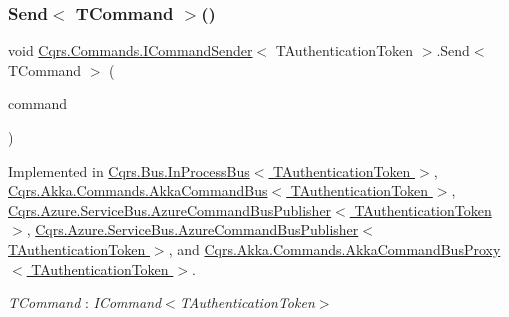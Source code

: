 \subsubsection{\texorpdfstring{Send$<$ T\+Command $>$()}{Send< TCommand >()}\hspace{0.1cm}{\footnotesize\ttfamily [1/2]}}
{\footnotesize\ttfamily void \hyperlink{interfaceCqrs_1_1Commands_1_1ICommandSender}{Cqrs.\+Commands.\+I\+Command\+Sender}$<$ T\+Authentication\+Token $>$.Send$<$ T\+Command $>$ (\begin{DoxyParamCaption}\item[{T\+Command}]{command }\end{DoxyParamCaption})}



Implemented in \hyperlink{classCqrs_1_1Bus_1_1InProcessBus_a6a074ef3663d2855875307b106fe4416}{Cqrs.\+Bus.\+In\+Process\+Bus$<$ T\+Authentication\+Token $>$}, \hyperlink{classCqrs_1_1Akka_1_1Commands_1_1AkkaCommandBus_a696f471533265685f80922e39727288e}{Cqrs.\+Akka.\+Commands.\+Akka\+Command\+Bus$<$ T\+Authentication\+Token $>$}, \hyperlink{classCqrs_1_1Azure_1_1ServiceBus_1_1AzureCommandBusPublisher_ad4bbbadcac7eb6a83e47649979bc2e7f}{Cqrs.\+Azure.\+Service\+Bus.\+Azure\+Command\+Bus\+Publisher$<$ T\+Authentication\+Token $>$}, \hyperlink{classCqrs_1_1Azure_1_1ServiceBus_1_1AzureCommandBusPublisher_ad4bbbadcac7eb6a83e47649979bc2e7f}{Cqrs.\+Azure.\+Service\+Bus.\+Azure\+Command\+Bus\+Publisher$<$ T\+Authentication\+Token $>$}, and \hyperlink{classCqrs_1_1Akka_1_1Commands_1_1AkkaCommandBusProxy_a15945f41b7439e722f5608f48b63c6d9}{Cqrs.\+Akka.\+Commands.\+Akka\+Command\+Bus\+Proxy$<$ T\+Authentication\+Token $>$}.

\begin{Desc}
\item[Type Constraints]\begin{description}
\item[{\em T\+Command} : {\em I\+Command$<$T\+Authentication\+Token$>$}]\end{description}
\end{Desc}
\mbox{\label{interfaceCqrs_1_1Commands_1_1ICommandSender_a3fb3ec40a3e862f721a7c9204e67e832}} 
